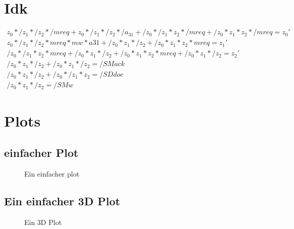 \documentclass{scrartcl}
\begin{document}
\section{Idk}
\begin{align*}
    z_0*/z_1*/z_2*/mreq + z_0*/z_1*/z_2*/a_{31} + /z_0*/z_1*z_2*/mreq + /z_0*z_1*z_2*/mreq = z_0' \\
    z_0*/z_1*/z_2*mreq*mw*a31 + /z_0*z_1*/z_2 + /z_0*z_1*z_2*mreq = z_1' \\
    /z_0*/z_1*z_2*mreq + /z_0*z_1*/z_2 + /z_0*z_1*z_2*mreq + /z_0*z_1*/z_2 = z_2' \\
    /z_0*z_1*/z_2+/z_0*z_1*/z_2 = /SMack \\
    /z_0*z_1*/z_2+/z_0*/z_1*z_2 = /SDdoe \\
    /z_0*z_1*/z_2 = /SMw
\end{align*}

\section{Plots}
\subsection{einfacher Plot}
\noindent
\FloatBarrier
\begin{figure}[ht]
        \centering
        \caption{Ein einfacher plot}
        \label{fig:simpleplot}
    \end{figure}
\FloatBarrier
\subsection{Ein einfacher 3D Plot}
\noindent
\FloatBarrier
\begin{figure}[ht]
        \centering
        \caption{Ein 3D Plot}
        \label{plt:3dplot}
\end{figure}
\end{document}
